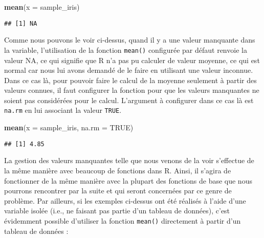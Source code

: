 \documentclass[
  french,
]{book}
\newenvironment{Shaded}{\begin{snugshade}}{\end{snugshade}}
\newcommand{\DataTypeTok}[1]{\textcolor[rgb]{0.13,0.29,0.53}{#1}}
\newcommand{\KeywordTok}[1]{\textcolor[rgb]{0.13,0.29,0.53}{\textbf{#1}}}
\newcommand{\NormalTok}[1]{#1}
\newcommand{\OperatorTok}[1]{\textcolor[rgb]{0.81,0.36,0.00}{\textbf{#1}}}
\newcommand{\OtherTok}[1]{\textcolor[rgb]{0.56,0.35,0.01}{#1}}
\begin{document}
\begin{Shaded}
\begin{Highlighting}[]
\KeywordTok{mean}\NormalTok{(}\DataTypeTok{x =}\NormalTok{ sample_iris)}
\end{Highlighting}
\end{Shaded}

\begin{verbatim}
## [1] NA
\end{verbatim}

Comme nous pouvons le voir ci-dessus, quand il y a une valeur manquante dans la variable, l'utilisation de la fonction \texttt{mean()} configurée par défaut renvoie la valeur NA, ce qui signifie que R n'a pas pu calculer de valeur moyenne, ce qui est normal car nous lui avons demandé de le faire en utilisant une valeur inconnue. Dans ce cas là, pour pouvoir faire le calcul de la moyenne seulement à partir des valeurs connues, il faut configurer la fonction pour que les valeurs manquantes ne soient pas considérées pour le calcul. L'argument à configurer dans ce cas là est \texttt{na.rm} en lui associant la valeur \texttt{TRUE}.

\begin{Shaded}
\begin{Highlighting}[]
\KeywordTok{mean}\NormalTok{(}\DataTypeTok{x =}\NormalTok{ sample_iris, }\DataTypeTok{na.rm =} \OtherTok{TRUE}\NormalTok{)}
\end{Highlighting}
\end{Shaded}

\begin{verbatim}
## [1] 4.85
\end{verbatim}

La gestion des valeurs manquantes telle que nous venons de la voir s'effectue de la même manière avec beaucoup de fonctions dans R. Ainsi, il s'agira de fonctionner de la même manière avec la plupart des fonctions de base que nous pourrons rencontrer par la suite et qui seront concernées par ce genre de problème. Par ailleurs, si les exemples ci-dessus ont été réalisés à l'aide d'une variable isolée (i.e., ne faisant pas partie d'un tableau de données), c'est évidemment possible d'utiliser la fonction \texttt{mean()} directement à partir d'un tableau de données :

\begin{Shaded}
\end{Shaded}
\end{document}

